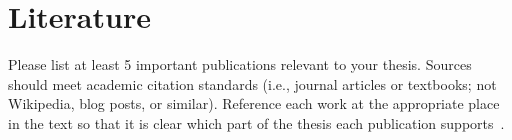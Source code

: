 \section*{Literature}
\label{sec:refs}

Please list at least 5 important publications relevant to your thesis.
Sources should meet academic citation standards (i.e., journal articles or textbooks; not Wikipedia, blog posts, or similar).
Reference each work at the appropriate place in the text so that it is clear which part of the thesis each publication supports~\cite{Goodliffe2007}.

\blindtext
